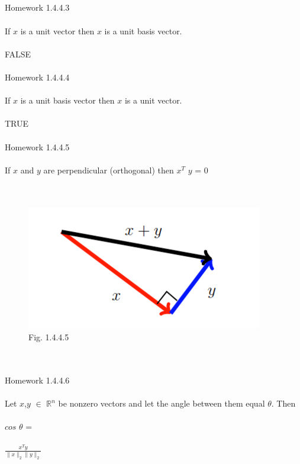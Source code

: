 \documentclass[11pt]{article}
\begin{document}
\\
\\
\\
\\
Homework 1.4.4.3
\\
\\
If $x$ is a unit vector then $x$ is a unit basis vector.
\\
\\
FALSE
\\
\\
Homework 1.4.4.4
\\
\\
If $x$ is a unit basis vector then $x$ is a unit vector.
\\
\\
TRUE
\\
\\
\newpage
Homework 1.4.4.5
\\
\\
If $x$ and $y$ are perpendicular (orthogonal) then $x^{T}$ $y$ = 0
\\
\\
\\
\begin{figure}
  \includegraphics[width=\linewidth]{HW_1.png}
  \caption{Fig. 1.4.4.5}
  \label{Fig.1.4.4.5}
\end{figure}
\\
\\
\newpage
Homework 1.4.4.6
\\
\\
Let $x$,$y$ $\in$ $\mathbb{R}^n$ be nonzero vectors and let the angle between them
equal $\theta$. Then 
\\
\\
$cos$ $\theta$ = 
\\
\\
$\frac{x^{T}y}{\parallel x \parallel_{2} \parallel y \parallel_{2}}$
\\
\end{document}
